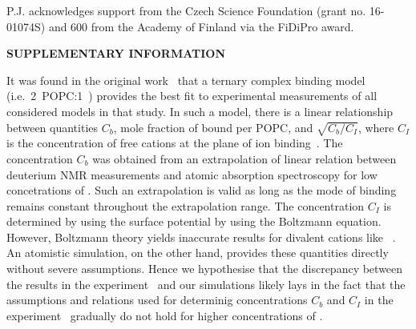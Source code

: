 \documentclass[aip,jcp,twocolumn]{revtex4}
\begin{document}
\begin{acknowledgments}
P.J. acknowledges support from the Czech Science Foundation (grant no. 16-01074S) 
and 600 from the Academy of Finland via the FiDiPro award.
\end{acknowledgments}


\newpage
\appendix


\begin{center}
{\bf SUPPLEMENTARY INFORMATION}
\end{center}

It was found in the original work~\cite{altenbach84} that 
a ternary complex binding model (i.e.~2~POPC:1~)
provides the best fit to experimental measurements of all considered models in that study. 
In such a model, there is a linear relationship between quantities 
$C_b$, mole fraction of bound  per POPC, and $\sqrt{C_b/C_I}$, 
where $C_I$ is the concentration of free cations at the plane of ion binding~\cite{altenbach84}.
The concentration $C_b$ was obtained from an extrapolation of linear relation 
between deuterium NMR measurements and atomic absorption spectroscopy for low concetrations of .
Such an extrapolation is valid as long as the mode of  binding 
remains constant throughout the extrapolation range. 
The concentration $C_I$ is determined by using the surface potential by using the Boltzmann equation.
However, Boltzmann theory yields inaccurate results
for divalent cations like ~\cite{Andelman1995}. 
An atomistic simulation, on the other hand, provides these quantities directly without severe assumptions.
Hence we hypothesise that the discrepancy between the results in the experiment~\cite{altenbach84} and 
our simulations likely lays in the fact that 
the assumptions and relations used for determinig concentrations $C_b$ and $C_I$ in the experiment~\cite{altenbach84}
gradually do not hold for higher concentrations of . 
\end{document}
